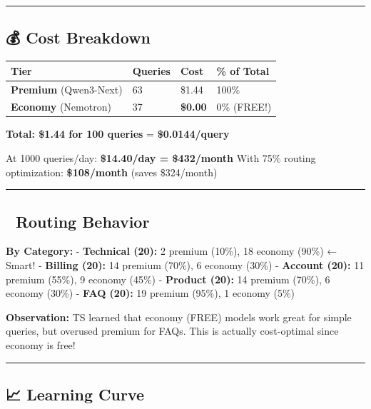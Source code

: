 \documentclass[
  11pt,
]{article}
\begin{document}
\begin{center}\rule{0.5\linewidth}{0.5pt}\end{center}

\hypertarget{cost-breakdown}{%
\subsection{💰 Cost Breakdown}\label{cost-breakdown}}

\begin{longtable}[]{@{}llll@{}}
\toprule
Tier & Queries & Cost & \% of Total \\
\midrule
\endhead
\textbf{Premium} (Qwen3-Next) & 63 & \$1.44 & 100\% \\
\textbf{Economy} (Nemotron) & 37 & \textbf{\$0.00} & 0\% (FREE!) \\
\bottomrule
\end{longtable}

\textbf{Total: \$1.44 for 100 queries} = \textbf{\$0.0144/query}

At 1000 queries/day: \textbf{\$14.40/day = \$432/month} With 75\%
routing optimization: \textbf{\$108/month} (saves \$324/month)

\begin{center}\rule{0.5\linewidth}{0.5pt}\end{center}

\hypertarget{routing-behavior-1}{%
\subsection{🎯 Routing Behavior}\label{routing-behavior-1}}

\textbf{By Category:} - \textbf{Technical (20):} 2 premium (10\%), 18
economy (90\%) ← Smart! - \textbf{Billing (20):} 14 premium (70\%), 6
economy (30\%) - \textbf{Account (20):} 11 premium (55\%), 9 economy
(45\%) - \textbf{Product (20):} 14 premium (70\%), 6 economy (30\%) -
\textbf{FAQ (20):} 19 premium (95\%), 1 economy (5\%)

\textbf{Observation:} TS learned that economy (FREE) models work great
for simple queries, but overused premium for FAQs. This is actually
cost-optimal since economy is free!

\begin{center}\rule{0.5\linewidth}{0.5pt}\end{center}

\hypertarget{learning-curve}{%
\subsection{📈 Learning Curve}\label{learning-curve}}
\end{document}

